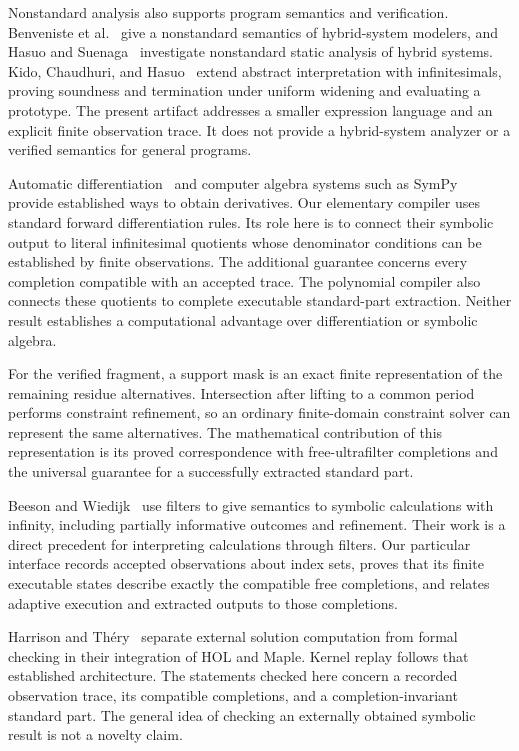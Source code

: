\documentclass[11pt,a4paper]{article}
\theoremstyle{result}
\theoremstyle{definition}
\begin{document}
Nonstandard analysis also supports program semantics and verification. Benveniste et al.~\cite{Benveniste2012} give a nonstandard semantics of hybrid-system modelers, and Hasuo and Suenaga~\cite{HasuoSuenaga2012} investigate nonstandard static analysis of hybrid systems. Kido, Chaudhuri, and Hasuo~\cite{Kido2015} extend abstract interpretation with infinitesimals, proving soundness and termination under uniform widening and evaluating a prototype. The present artifact addresses a smaller expression language and an explicit finite observation trace. It does not provide a hybrid-system analyzer or a verified semantics for general programs.

Automatic differentiation~\cite{Griewank2008,Baydin2018} and computer algebra systems such as SymPy~\cite{Meurer2017} provide established ways to obtain derivatives. Our elementary compiler uses standard forward differentiation rules. Its role here is to connect their symbolic output to literal infinitesimal quotients whose denominator conditions can be established by finite observations. The additional guarantee concerns every completion compatible with an accepted trace. The polynomial compiler also connects these quotients to complete executable standard-part extraction. Neither result establishes a computational advantage over differentiation or symbolic algebra.

For the verified fragment, a support mask is an exact finite representation of the remaining residue alternatives. Intersection after lifting to a common period performs constraint refinement, so an ordinary finite-domain constraint solver can represent the same alternatives. The mathematical contribution of this representation is its proved correspondence with free-ultrafilter completions and the universal guarantee for a successfully extracted standard part.

Beeson and Wiedijk~\cite{BeesonWiedijk2005} use filters to give semantics to symbolic calculations with infinity, including partially informative outcomes and refinement. Their work is a direct precedent for interpreting calculations through filters. Our particular interface records accepted observations about index sets, proves that its finite executable states describe exactly the compatible free completions, and relates adaptive execution and extracted outputs to those completions.

Harrison and Th\'ery~\cite{HarrisonThery1998} separate external solution computation from formal checking in their integration of HOL and Maple. Kernel replay follows that established architecture. The statements checked here concern a recorded observation trace, its compatible completions, and a completion-invariant standard part. The general idea of checking an externally obtained symbolic result is not a novelty claim.
\end{document}
